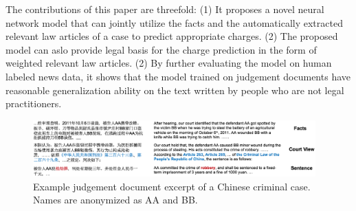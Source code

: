 
The contributions of this paper are threefold: 
(1) It proposes a novel neural network model that can jointly utilize the facts and the automatically extracted relevant law articles of a case to predict appropriate charges.
(2) The proposed model can aslo provide legal basis for the charge prediction in the form of weighted relevant law articles.
(2) By further evaluating the model on human labeled news data, it shows that the model trained on judgement documents have reasonable generalization ability on the text written by people who are not legal practitioners.


\begin{figure}[t!]
\begin{center}
\includegraphics[width=0.97\textwidth]{figures/case.png}	
\caption{Example judgement document excerpt of a Chinese criminal case. Names are anonymized as AA and BB.}
\label{fig_example_case}
\end{center}
\end{figure}
